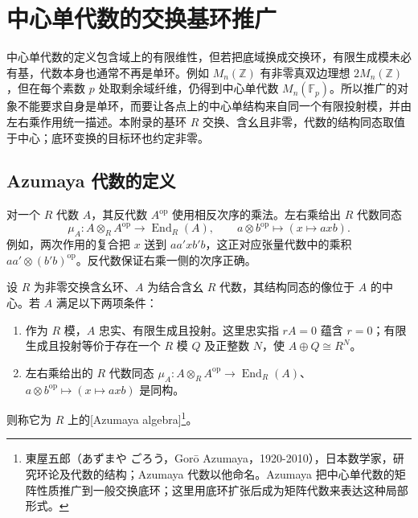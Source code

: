 

\section{中心单代数的交换基环推广}
\label{b2:sec:C01}

中心单代数的定义包含域上的有限维性，但若把底域换成交换环，有限生成模未必有基，代数本身也通常不再是单环。例如 \(M_n(\mathbb Z)\) 有非零真双边理想 \(2M_n(\mathbb Z)\)，但在每个素数 \(p\) 处取剩余域纤维，仍得到中心单代数 \(M_n(\mathbb F_p)\)。所以推广的对象不能要求自身是单环，而要让各点上的中心单结构来自同一个有限投射模，并由左右乘作用统一描述。本附录的基环 \(R\) 交换、含幺且非零，代数的结构同态取值于中心；底环变换的目标环也约定非零。

\subsection{Azumaya 代数的定义}
\label{b2:subsec:C01:01}

对一个 \(R\) 代数 \(A\)，其反代数 \(A^{\mathrm{op}}\) 使用相反次序的乘法。左右乘给出 \(R\) 代数同态
\begin{equation}\label{b2:eq:azumaya-enveloping}
	\mu_A:A\otimes_R A^{\mathrm{op}}\longrightarrow\operatorname{End}_R(A), \qquad a\otimes b^{\mathrm{op}}\longmapsto(x\mapsto axb).
\end{equation}
例如，两次作用的复合把 \(x\) 送到 \(aa'xb'b\)，这正对应张量代数中的乘积 \(aa'\otimes(b'b)^{\mathrm{op}}\)。反代数保证右乘一侧的次序正确。

\begin{definition}\label{b2:def:azumaya-algebra}
	设 \(R\) 为非零交换含幺环、\(A\) 为结合含幺 \(R\) 代数，其结构同态的像位于 \(A\) 的中心。若 \(A\) 满足以下两项条件：
	\begin{enumerate}
		\item 作为 \(R\) 模，\(A\) 忠实、有限生成且投射。这里忠实指 \(rA=0\) 蕴含 \(r=0\)；有限生成且投射等价于存在一个 \(R\) 模 \(Q\) 及正整数 \(N\)，使 \(A\oplus Q\cong R^N\)。
		\item 左右乘给出的 \(R\) 代数同态 \(\mu_A:A\otimes_RA^{\mathrm{op}}\to\operatorname{End}_R(A)\)、\(a\otimes b^{\mathrm{op}}\mapsto(x\mapsto axb)\) 是同构。
	\end{enumerate}
	则称它为 \(R\) 上的[Azumaya algebra]\footnote{東屋五郎（あずまや ごろう，Gorō Azumaya，1920-2010），日本数学家，研究环论及代数的结构；Azumaya 代数以他命名。Azumaya 把中心单代数的矩阵性质推广到一般交换底环；这里用底环扩张后成为矩阵代数来表达这种局部形式。}。
\end{definition}

